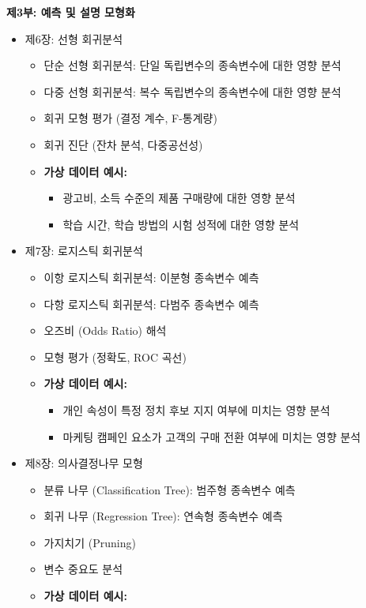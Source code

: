 \documentclass[
  letterpaper,
]{book}
\providecommand{\tightlist}{%
  \setlength{\itemsep}{0pt}\setlength{\parskip}{0pt}}
\begin{document}
\textbf{제3부: 예측 및 설명 모형화}

\begin{itemize}
\tightlist
\item
  제6장: 선형 회귀분석

  \begin{itemize}
  \tightlist
  \item
    단순 선형 회귀분석: 단일 독립변수의 종속변수에 대한 영향 분석
  \item
    다중 선형 회귀분석: 복수 독립변수의 종속변수에 대한 영향 분석
  \item
    회귀 모형 평가 (결정 계수, F-통계량)
  \item
    회귀 진단 (잔차 분석, 다중공선성)
  \item
    \textbf{가상 데이터 예시:}

    \begin{itemize}
    \tightlist
    \item
      광고비, 소득 수준의 제품 구매량에 대한 영향 분석
    \item
      학습 시간, 학습 방법의 시험 성적에 대한 영향 분석
    \end{itemize}
  \end{itemize}
\item
  제7장: 로지스틱 회귀분석

  \begin{itemize}
  \tightlist
  \item
    이항 로지스틱 회귀분석: 이분형 종속변수 예측
  \item
    다항 로지스틱 회귀분석: 다범주 종속변수 예측
  \item
    오즈비 (Odds Ratio) 해석
  \item
    모형 평가 (정확도, ROC 곡선)
  \item
    \textbf{가상 데이터 예시:}

    \begin{itemize}
    \tightlist
    \item
      개인 속성이 특정 정치 후보 지지 여부에 미치는 영향 분석
    \item
      마케팅 캠페인 요소가 고객의 구매 전환 여부에 미치는 영향 분석
    \end{itemize}
  \end{itemize}
\item
  제8장: 의사결정나무 모형

  \begin{itemize}
  \tightlist
  \item
    분류 나무 (Classification Tree): 범주형 종속변수 예측
  \item
    회귀 나무 (Regression Tree): 연속형 종속변수 예측
  \item
    가지치기 (Pruning)
  \item
    변수 중요도 분석
  \item
    \textbf{가상 데이터 예시:}


\end{itemize}
\end{itemize}
\end{document}
